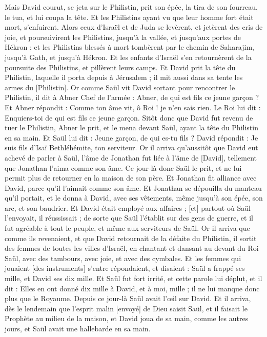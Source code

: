 \begin{multicols}{2}
Mais David courut, se jeta sur le Philistin, prit son épée, la tira de son fourreau, le tua, et lui coupa la tête. Et les Philistins ayant vu que leur homme fort était mort, s'enfuirent.
Alors ceux d'Israël et de Juda se levèrent, et jetèrent des cris de joie, et poursuivirent les Philistins, jusqu'à la vallée, et jusqu'aux portes de Hékron ; et les Philistins blessés à mort tombèrent par le chemin de Saharajim, jusqu'à Gath, et jusqu'à Hékron.
Et les enfants d'Israël s'en retournèrent de la poursuite des Philistins, et pillèrent leurs camps.
Et David prit la tête du Philistin, laquelle il porta depuis à Jérusalem ; il mit aussi dans sa tente les armes du [Philistin].
Or comme Saül vit David sortant pour rencontrer le Philistin, il dit à Abner Chef de l'armée : Abner, de qui est fils ce jeune garçon ? Et Abner répondit : Comme ton âme vit, ô Roi ! je n'en sais rien.
Le Roi lui dit : Enquiers-toi de qui est fils ce jeune garçon.
Sitôt donc que David fut revenu de tuer le Philistin, Abner le prit, et le mena devant Saül, ayant la tête du Philistin en sa main.
Et Saül lui dit : Jeune garçon, de qui es-tu fils ? David répondit : Je suis fils d'Isaï Bethléhémite, ton serviteur.
\VerseOne{}Or il arriva qu'aussitôt que David eut achevé de parler à Saül, l'âme de Jonathan fut liée à l'âme de [David], tellement que Jonathan l'aima comme son âme.
Ce jour-là donc Saül le prit, et ne lui permit plus de retourner en la maison de son père.
Et Jonathan fit alliance avec David, parce qu'il l'aimait comme son âme.
Et Jonathan se dépouilla du manteau qu'il portait, et le donna à David, avec ses vêtements, même jusqu'à son épée, son arc, et son baudrier.
Et David était employé aux affaires ; [et] partout où Saül l'envoyait, il réussissait ; de sorte que Saül l'établit sur des gens de guerre, et il fut agréable à tout le peuple, et même aux serviteurs de Saül.
Or il arriva que comme ils revenaient, et que David retournait de la défaite du Philistin, il sortit des femmes de toutes les villes d'Israël, en chantant et dansant au devant du Roi Saül, avec des tambours, avec joie, et avec des cymbales.
Et les femmes qui jouaient [des instruments] s'entre répondaient, et disaient : Saül a frappé ses mille, et David ses dix mille.
Et Saül fut fort irrité, et cette parole lui déplut, et il dit : Elles en ont donné dix mille à David, et à moi, mille ; il ne lui manque donc plus que le Royaume.
Depuis ce jour-là Saül avait l'œil sur David.
Et il arriva, dès le lendemain que l'esprit malin [envoyé] de Dieu saisit Saül, et il faisait le Prophète au milieu de la maison, et David joua de sa main, comme les autres jours, et Saül avait une hallebarde en sa main.

\end{multicols}

